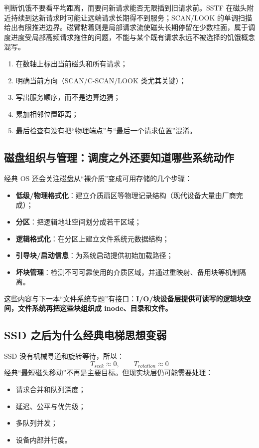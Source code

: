 \documentclass[UTF8,fontset=fandol,11pt,a4paper]{ctexart}
\newcommand{\kw}[1]{\textbf{#1}}
\begin{document}
判断饥饿不要看平均距离，而要问新请求能否无限插到旧请求前。SSTF 在磁头附近持续到达新请求时可能让远端请求长期得不到服务；SCAN/LOOK 的单调扫描给出有限推进边界。磁臂粘着则是局部请求流使磁头长期停留在少数柱面，属于调度进度受局部高频请求拖住的问题，不能与某个既有请求永远不被选择的饥饿概念混写。

\begin{center}

\end{center}

\begin{method}[磁盘调度题五步法]
\begin{enumerate}
  \item 在数轴上标出当前磁头和所有请求；
  \item 明确当前方向（SCAN/C-SCAN/LOOK 类尤其关键）；
  \item 写出服务顺序，而不是边算边猜；
  \item 累加相邻位置距离；
  \item 最后检查有没有把“物理端点”与“最后一个请求位置”混淆。
\end{enumerate}
\end{method}

\subsection{磁盘组织与管理：调度之外还要知道哪些系统动作}
经典 OS 还会关注磁盘从“裸介质”变成可用存储的几个步骤：
\begin{itemize}
  \item \kw{低级/物理格式化}：建立介质扇区等物理记录结构（现代设备大量由厂商完成）；
  \item \kw{分区}：把逻辑地址空间划分成若干区域；
  \item \kw{逻辑格式化}：在分区上建立文件系统元数据结构；
  \item \kw{引导块/启动信息}：为系统启动提供初始加载路径；
  \item \kw{坏块管理}：检测不可可靠使用的介质区域，并通过重映射、备用块等机制隔离。
\end{itemize}
这些内容与下一本“文件系统专题”有接口：\kw{I/O/块设备层提供可读写的逻辑块空间，文件系统再把这些块组织成 inode、目录和文件。}

\subsection{SSD 之后为什么经典电梯思想变弱}
SSD 没有机械寻道和旋转等待，所以：
\[
T_{seek}\approx 0,\qquad T_{rotation}\approx 0
\]
经典“最短磁头移动”不再是主要目标。但现实块层仍可能需要处理：
\begin{itemize}
  \item 请求合并和队列深度；
  \item 延迟、公平与优先级；
  \item 多队列并发；
  \item 设备内部并行度。
\end{itemize}
\end{document}
